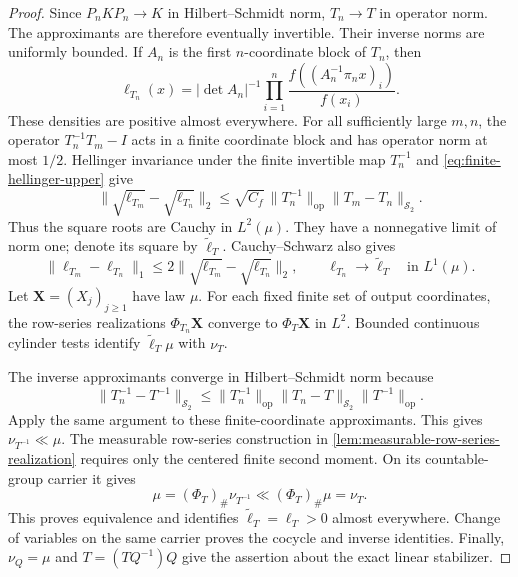 \begin{proof}
Since $P_nKP_n\to K$ in Hilbert--Schmidt norm, $T_n\to T$ in
operator norm.
The approximants are therefore eventually invertible.
Their inverse norms are uniformly bounded.
If $A_n$ is the first $n$-coordinate block of $T_n$, then
\begin{equation}
 \ell_{T_n}(x)=|\det A_n|^{-1}
     \prod_{i=1}^n\frac{f((A_n^{-1}\pi_n x)_i)}{f(x_i)}.
 \label{eq:finite-approximant-density}
\end{equation}
These densities are positive almost everywhere.
For all sufficiently large $m,n$, the operator $T_n^{-1}T_m-I$
acts in a finite coordinate block and has operator norm at most $1/2$.
Hellinger invariance under the finite invertible map $T_n^{-1}$ and
\eqref{eq:finite-hellinger-upper} give
\begin{equation}
 \|\sqrt{\ell_{T_m}}-\sqrt{\ell_{T_n}}\|_2
 \le\sqrt{C_f}\,\|T_n^{-1}\|_{\mathrm{op}}
                    \|T_m-T_n\|_{\mathcal S_2}.
 \label{eq:approximant-hellinger-cauchy}
\end{equation}
Thus the square roots are Cauchy in $L^2(\mu)$.
They have a nonnegative limit of norm one; denote its square by
$\widetilde\ell_T$.
Cauchy--Schwarz also gives
\begin{equation}
 \|\ell_{T_m}-\ell_{T_n}\|_1
 \le2\|\sqrt{\ell_{T_m}}-\sqrt{\ell_{T_n}}\|_2,
 \qquad \ell_{T_n}\longrightarrow \widetilde\ell_T
       \quad\text{in }L^1(\mu).
 \label{eq:approximant-l1-cauchy}
\end{equation}
Let $\mathbf X=(X_j)_{j\ge1}$ have law $\mu$.
For each fixed finite set of output coordinates, the row-series
realizations $\Phi_{T_n}\mathbf X$ converge to $\Phi_T\mathbf X$ in $L^2$.
Bounded continuous cylinder tests identify $\widetilde\ell_T\mu$ with
$\nu_T$.

The inverse approximants converge in Hilbert--Schmidt norm because
\[
 \|T_n^{-1}-T^{-1}\|_{\mathcal S_2}
 \le\|T_n^{-1}\|_{\mathrm{op}}
       \|T_n-T\|_{\mathcal S_2}\|T^{-1}\|_{\mathrm{op}}.
\]
Apply the same argument to these finite-coordinate approximants.
This gives $\nu_{T^{-1}}\ll\mu$.
The measurable row-series construction in
\cref{lem:measurable-row-series-realization} requires only the centered finite
second moment.
On its countable-group carrier it gives
\[
 \mu=(\Phi_T)_\#\nu_{T^{-1}}
       \ll(\Phi_T)_\#\mu=\nu_T.
\]
This proves equivalence and identifies
$\widetilde\ell_T=\ell_T>0$ almost everywhere.
Change of variables on the same carrier proves the cocycle and inverse
identities.
Finally, $\nu_Q=\mu$ and $T=(TQ^{-1})Q$ give the assertion about the exact
linear stabilizer.
\end{proof}

